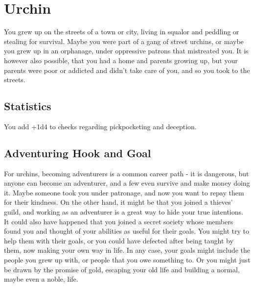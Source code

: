 \section{Urchin}\label{background:urchin}
You grew up on the streets of a town or city, living in squalor and peddling or stealing for survival.
Maybe you were part of a gang of street urchins, or maybe you grew up in an orphanage, under oppressive patrons that mistreated you.
It is however also possible, that you had a home and parents growing up, but your parents were poor or addicted and didn't take care of you, and so you took to the streets.

\subsection{Statistics}
You add +1d4 to checks regarding pickpocketing and deception.

\subsection{Adventuring Hook and Goal}
For urchins, becoming adventurers is a common career path - it is dangerous, but anyone can become an adventurer, and a few even survive and make money doing it.
Maybe someone took you under patronage, and now you want to repay them for their kindness.
On the other hand, it might be that you joined a thieves' guild, and working as an adventurer is a great way to hide your true intentions.
It could also have happened that you joined a secret society whose members found you and thought of your abilities as useful for their goals.
You might try to help them with their goals, or you could have defected after being taught by them, now making your own way in life.
In any case, your goals might include the people you grew up with, or people that you owe something to.
Or you might just be drawn by the promise of gold, escaping your old life and building a normal, maybe even a noble, life.